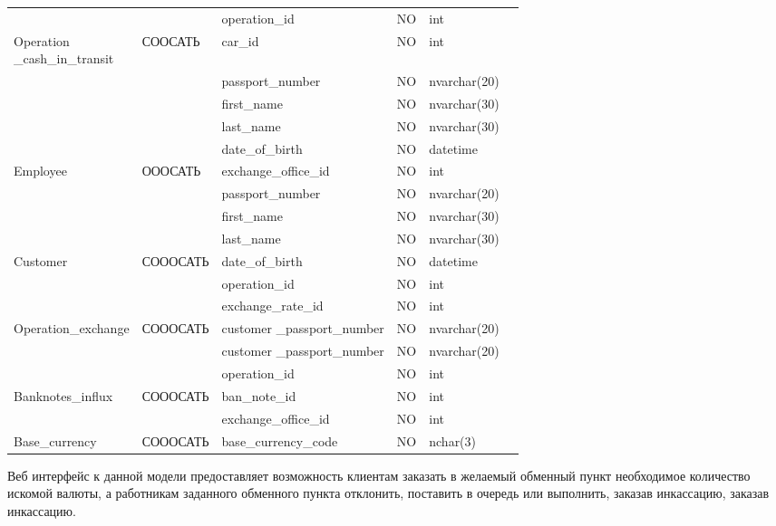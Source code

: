 \documentclass{article}
\begin{document}
\begin{center}
\begin{tabular}{|l| m{4cm}| m{3.2cm}| m{2cm}| m{2cm}| l|}
&&operation\_id&	NO&	int&\\ \cline{3-6}
\multirow{-2}{3.5cm}{Operation\\\_cash\_in\_transit}&\multirow{-2}{*}{СООСАТЬ}	&car\_id	&NO&	int&\\ \hline

&&passport\_number&	NO&	nvarchar(20)&\\ \cline{3-6}
&&first\_name&	NO&	nvarchar(30)&\\ \cline{3-6}
&&last\_name&	NO&	nvarchar(30)&\\ \cline{3-6}
&&date\_of\_birth&	NO&	datetime&\\ \cline{3-6}
\multirow{-5}{*}{Employee} & \multirow{-5}{*}{ОООСАТЬ}&	exchange\_office\_id&	NO&	int&\\ \hline


&&passport\_number&	NO&	nvarchar(20)&\\ \cline{3-6}
&&first\_name&	NO&	nvarchar(30)&\\ \cline{3-6}
&&last\_name&	NO&	nvarchar(30)&\\ \cline{3-6}
\multirow{-4}{*}{Customer}	& \multirow{-4}{*}{СОООСАТЬ}&	date\_of\_birth&	NO&	datetime&\\ \hline


&&operation\_id&	NO&	int&\\ \cline{3-6}
&&exchange\_rate\_id&	NO&	int&\\ \cline{3-6}
\multirow{-3}{*}{Operation\_exchange}&	\multirow{-3}{*}{СОООСАТЬ} &customer \_passport\_number	&NO&	nvarchar(20)&\\ \hline


&&customer \_passport\_number&	NO	&nvarchar(20)&\\ \cline{3-6}
&&operation\_id&	NO&	int&\\ \cline{3-6}
\multirow{-2}{*}{Banknotes\_influx}	& \multirow{-2}{*}{СОООСАТЬ}&	ban\_note\_id&	NO&	int&\\ \hline




&&exchange\_office\_id&	NO&	int&\\ \cline{3-6}
\multirow{-2}{*}{Base\_currency}	& \multirow{-2}{*}{СОООСАТЬ}& base\_currency\_code&	NO&	nchar(3)&\\
\hline

\end{tabular}
\egroup
\end{center}
\medskip
Веб интерфейс к данной модели предоставляет возможность клиентам заказать в желаемый обменный пункт необходимое количество искомой валюты, а работникам заданного обменного пункта отклонить, поставить в очередь или выполнить, заказав инкассацию, заказав инкассацию.
\end{document}
